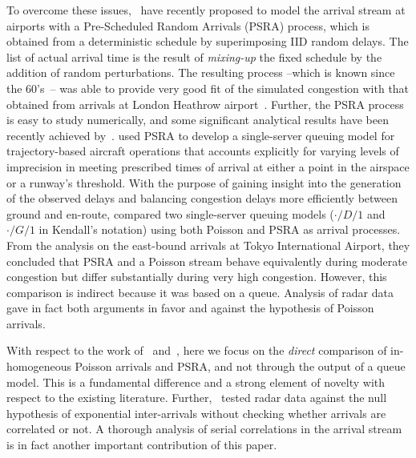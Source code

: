 \documentclass[draft,review]{elsarticle}
\begin{document}
To overcome these issues,~\citet{guadagni2011queueing} have recently proposed to model the arrival stream at airports with a Pre-Scheduled Random Arrivals (\ac{PSRA}) process, which is obtained from a deterministic schedule by superimposing \ac{IID} random delays.
The list of actual arrival time is the result of \emph{mixing-up} the fixed schedule by the addition of random perturbations.
The resulting process --which is known since the 60's~\citep{Kendall1964}-- was able to provide very good fit of the simulated congestion with that obtained from arrivals at London Heathrow airport~\citep{caccavale2014model}.
Further, the \ac{PSRA} process is easy to study numerically, and some significant analytical results have been recently achieved by~\citet{lancia2013advances}.
\citet{nikoleris2012queueing} used \ac{PSRA} to develop a single-server queuing model for trajectory-based aircraft operations that accounts explicitly for varying levels of imprecision in meeting prescribed times of arrival at either a point in the airspace or a runway’s threshold.
With the purpose of gaining insight into the generation of the observed delays and balancing congestion delays more efficiently between ground and en-route, \citet{gwiggner2014data} compared two single-server queuing models (\(\cdot/D/1\) and \(\cdot/G/1\) in Kendall's notation) using both Poisson and \ac{PSRA} as arrival processes.
From the analysis on the east-bound arrivals at Tokyo International Airport, they concluded that \ac{PSRA} and a Poisson stream behave equivalently during moderate congestion but differ substantially during very high congestion.
However, this comparison is indirect because it was based on a queue.
Analysis of radar data gave in fact both arguments in favor and against the hypothesis of Poisson arrivals.

With respect to the work of~\citep{caccavale2014model} and~\citet{gwiggner2014data}, here we focus on the \emph{direct} comparison of in-homogeneous Poisson arrivals and PSRA, and not through the output of a queue model.
This is a fundamental difference and a strong element of novelty with respect to the existing literature.
Further,~\citet{gwiggner2014data} tested radar data against the null hypothesis of exponential inter-arrivals without checking whether arrivals are correlated or not.
A thorough analysis of serial correlations in the arrival stream is in fact another important contribution of this paper.
\end{document}
